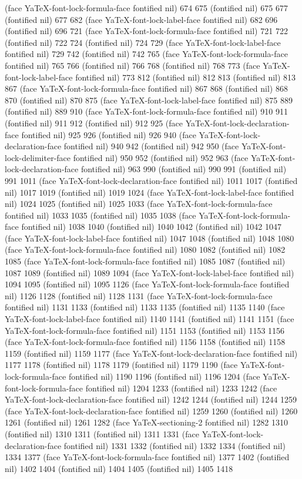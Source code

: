 (face YaTeX-font-lock-formula-face fontified nil) 674 675 (fontified nil) 675 677 (fontified nil) 677 682 (face YaTeX-font-lock-label-face fontified nil) 682 696 (fontified nil) 696 721 (face YaTeX-font-lock-formula-face fontified nil) 721 722 (fontified nil) 722 724 (fontified nil) 724 729 (face YaTeX-font-lock-label-face fontified nil) 729 742 (fontified nil) 742 765 (face YaTeX-font-lock-formula-face fontified nil) 765 766 (fontified nil) 766 768 (fontified nil) 768 773 (face YaTeX-font-lock-label-face fontified nil) 773 812 (fontified nil) 812 813 (fontified nil) 813 867 (face YaTeX-font-lock-formula-face fontified nil) 867 868 (fontified nil) 868 870 (fontified nil) 870 875 (face YaTeX-font-lock-label-face fontified nil) 875 889 (fontified nil) 889 910 (face YaTeX-font-lock-formula-face fontified nil) 910 911 (fontified nil) 911 912 (fontified nil) 912 925 (face YaTeX-font-lock-declaration-face fontified nil) 925 926 (fontified nil) 926 940 (face YaTeX-font-lock-declaration-face fontified nil) 940 942 (fontified nil) 942 950 (face YaTeX-font-lock-delimiter-face fontified nil) 950 952 (fontified nil) 952 963 (face YaTeX-font-lock-declaration-face fontified nil) 963 990 (fontified nil) 990 991 (fontified nil) 991 1011 (face YaTeX-font-lock-declaration-face fontified nil) 1011 1017 (fontified nil) 1017 1019 (fontified nil) 1019 1024 (face YaTeX-font-lock-label-face fontified nil) 1024 1025 (fontified nil) 1025 1033 (face YaTeX-font-lock-formula-face fontified nil) 1033 1035 (fontified nil) 1035 1038 (face YaTeX-font-lock-formula-face fontified nil) 1038 1040 (fontified nil) 1040 1042 (fontified nil) 1042 1047 (face YaTeX-font-lock-label-face fontified nil) 1047 1048 (fontified nil) 1048 1080 (face YaTeX-font-lock-formula-face fontified nil) 1080 1082 (fontified nil) 1082 1085 (face YaTeX-font-lock-formula-face fontified nil) 1085 1087 (fontified nil) 1087 1089 (fontified nil) 1089 1094 (face YaTeX-font-lock-label-face fontified nil) 1094 1095 (fontified nil) 1095 1126 (face YaTeX-font-lock-formula-face fontified nil) 1126 1128 (fontified nil) 1128 1131 (face YaTeX-font-lock-formula-face fontified nil) 1131 1133 (fontified nil) 1133 1135 (fontified nil) 1135 1140 (face YaTeX-font-lock-label-face fontified nil) 1140 1141 (fontified nil) 1141 1151 (face YaTeX-font-lock-formula-face fontified nil) 1151 1153 (fontified nil) 1153 1156 (face YaTeX-font-lock-formula-face fontified nil) 1156 1158 (fontified nil) 1158 1159 (fontified nil) 1159 1177 (face YaTeX-font-lock-declaration-face fontified nil) 1177 1178 (fontified nil) 1178 1179 (fontified nil) 1179 1190 (face YaTeX-font-lock-formula-face fontified nil) 1190 1196 (fontified nil) 1196 1204 (face YaTeX-font-lock-formula-face fontified nil) 1204 1233 (fontified nil) 1233 1242 (face YaTeX-font-lock-declaration-face fontified nil) 1242 1244 (fontified nil) 1244 1259 (face YaTeX-font-lock-declaration-face fontified nil) 1259 1260 (fontified nil) 1260 1261 (fontified nil) 1261 1282 (face YaTeX-sectioning-2 fontified nil) 1282 1310 (fontified nil) 1310 1311 (fontified nil) 1311 1331 (face YaTeX-font-lock-declaration-face fontified nil) 1331 1332 (fontified nil) 1332 1334 (fontified nil) 1334 1377 (face YaTeX-font-lock-formula-face fontified nil) 1377 1402 (fontified nil) 1402 1404 (fontified nil) 1404 1405 (fontified nil) 1405 1418 